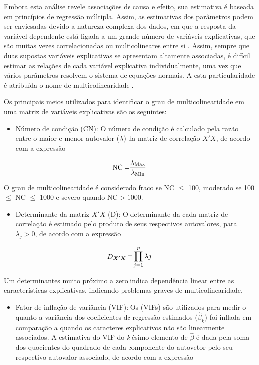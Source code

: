 \documentclass[
]{book}
\providecommand{\tightlist}{%
  \setlength{\itemsep}{0pt}\setlength{\parskip}{0pt}}
\begin{document}
Embora esta análise revele associações de causa e efeito, sua estimativa é baseada em princípios de regressão múltipla. Assim, as estimativas dos parâmetros podem ser enviesadas devido a natureza complexa dos dados, em que a resposta da variável dependente está ligada a um grande número de variáveis explicativas, que são muitas vezes correlacionadas ou multicolineares entre si \citep{Graham2003}. Assim, sempre que duas supostas variáveis explicativas se apresentam altamente associadas, é difícil estimar as relações de cada variável explicativa individualmente, uma vez que vários parâmetros resolvem o sistema de equações normais. A esta particularidade é atribuída o nome de multicolinearidade  \citep{Blalock1963}.

Os principais meios utilizados para identificar o grau de multicolinearidade em uma matriz de variáveis explicativas são os seguintes:

\begin{itemize}
\tightlist
\item
  Número de condição (CN):  O número de condição é calculado pela razão entre o maior e menor autovalor (\(\lambda\)) da matriz de correlação \(X'X\), de acordo com a expressão
\end{itemize}

\[
 {\rm{NC = }}\frac{{\lambda_{\rm{Max}}}}{{\lambda_{\rm{Min}}}}
\]

O grau de multicolinearidade é considerado fraco se NC \(\leq\) 100, moderado se 100 \(\leq\) NC \(\leq\) 1000 e severo quando NC \textgreater{} 1000.

\begin{itemize}
\tightlist
\item
  Determinante da matriz \(X'X\) (D):  O determinante da cada matriz de correlação é estimado pelo produto de seus respectivos autovalores, para \(\lambda_j > 0\), de acordo com a expressão
\end{itemize}

\[
\mathop D\nolimits_{{\boldsymbol{X'X}}} {\rm{  = }}\prod\limits_{j = 1}^p {\lambda j}
\]

Um determinantes muito próximo a zero indica dependência linear entre as características explicativas, indicando problemas graves de multicolinearidade.

\begin{itemize}
\tightlist
\item
  Fator de inflação de variância (VIF):  Os (VIFs) são utilizados para medir o quanto a variância dos coeficientes de regressão estimados (\(\hat \beta_k\)) foi inflada em comparação a quando os caracteres explicativos não são linearmente associados. A estimativa do VIF do \emph{k}-ésimo elemento de \(\hat \beta\) é dada pela soma dos quocientes do quadrado de cada componente do autovetor pelo seu respectivo autovalor associado, de acordo com a expressão
\end{itemize}
\end{document}
